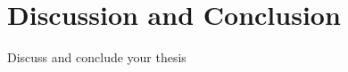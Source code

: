 \chapter{Discussion and Conclusion}
\label{chap:conclusion}

Discuss and conclude your thesis \citep{C}

